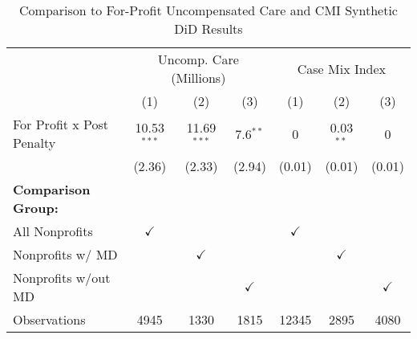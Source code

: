 \begin{table}[ht!]

\caption{\label{tab:forprofit_uncompCMI_synth} Comparison to For-Profit Uncompensated Care and CMI Synthetic DiD Results}
\centering
\begin{tabular}[t]{lcccccc}
\toprule
\multicolumn{1}{c}{ } & \multicolumn{3}{c}{Uncomp. Care (Millions)} & \multicolumn{3}{c}{Case Mix Index} \\
 & (1) & (2) & (3) & (1) & (2) & (3)\\
\midrule
For Profit x Post Penalty & 10.53$^{***}$ & 11.69$^{***}$ & 7.6$^{**}$ & 0 & 0.03$^{**}$ & 0\\
 & (2.36) & (2.33) & (2.94) & (0.01) & (0.01) & (0.01)\\
\textbf{Comparison Group:} &  &  &  &  &  & \\
All Nonprofits & $\checkmark$ &  &  & $\checkmark$ &  & \\
Nonprofits w/ MD &  & $\checkmark$ &  &  & $\checkmark$ & \\
\addlinespace
Nonprofits w/out MD &  &  & $\checkmark$ &  &  & $\checkmark$\\
Observations & 4945 & 1330 & 1815 & 12345 & 2895 & 4080\\
\bottomrule
\end{tabular}
\end{table}